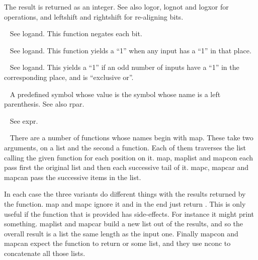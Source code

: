 \begin{description}
The result is returned as an integer. See also {\tx logor}, {\tx lognot}
and {\tx logxor} for operations, and {\tx leftshift} and {\tx rightshift}
for re-aligning bits.
\item[{\tx lognot~~~~~~~} \hspace{1cm} {\em function 1 arg}]~\newline
See {\tx logand}. This function negates each bit.
\item[{\tx logor~~~~~~~~} \hspace{1cm} {\em special form}]~\newline
See {\tx logand}. This function yields a ``1'' when any input has
a ``1'' in that place.
\item[{\tx logxor~~~~~~~} \hspace{1cm} {\em special form}]~\newline
See {\tx logand}. This yields a ``1'' if an odd number of inputs have a ``1''
in the corresponding place, and is ``exclusive or''.
\item[{\tx lpar~~~~~~~~~} \hspace{1cm} {\em predefined variable}]~\newline
A predefined symbol whose value is the symbol whose name is a left
parenthesis. See also {\tx rpar}.
\item[{\tx macro~~~~~~~~} \hspace{1cm} {\em symbol}]~\newline
See {\tx expr}.
\item[{\tx map~~~~~~~~~~} \hspace{1cm} {\em function 2 args}]~\newline
There are a number of functions whose names begin with {\tx map}. These
take two arguments, on a list and the second a function. Each of them
traverses the list calling the given function for each position on it.
{\tx map}, {\tx maplist} and {\tx mapcon} each pass first the original list
and then each successive tail of it. {\tx mapc}, {\tx mapcar} and {\tx mapcan}
pass the successive items in the list.

In each case the three variants do different things with the results returned
by the function. {\tx map} and {\tx mapc} ignore it and in the end just return
\nil. This is only useful if the function that is provided has side-effects. For
instance it might print something. {\tx maplist} and {\tx mapcar} build a new
list out of the results, and so the overall result is a list the same
length as the input one. Finally {\tx mapcon} and {\tx mapcan} expect the
function to return \nil{} or some list, and they use {\tx nconc} to
concatenate all those lists.


\end{description}
